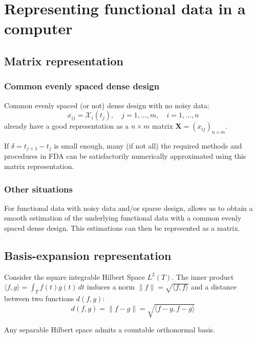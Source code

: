 \pagebreak
\section[Representing functional data]{Representing functional data in a computer}

\subsection{Matrix representation}

\subsubsection{Common evenly spaced dense design}
Common evenly spaced (or not) dense design with no noisy data:
\begin{equation*}
	x_{ij} = \mathcal X_i(t_j),\quad j=1,\ldots,m,\quad i=1,\ldots,n
\end{equation*}
already have a good representation as a $n\times m$ matrix
$\boldsymbol X = \left(x_{ij}\right)_{n\times m}$.

If $\delta = t_{j+1} - t_j$ is small enough, many (if not all) the
required methods and procedures in FDA can be satisfactorily numerically
approximated using this matrix representation.

\subsubsection{Other situations}
For functional data with noisy data and/or sparse design,  allows us to obtain a smooth estimation of the
underlying functional data with a common evenly spaced dense design. This
estimations can then be represented as a matrix.

\subsection{Basis-expansion representation}

Consider the square integrable Hilbert Space $L^2(T)$.
The inner product $\langle f, g\rangle = \int_T f(t)g(t)\,dt$ induces
a norm $\|f\| = \sqrt{\langle f, f\rangle}$ and a distance
between two functions $d(f, g)$:
\begin{equation*}
	d(f, g) = \lVert f - g \rVert = \sqrt{\langle f - g, f - g\rangle}
\end{equation*}

\begin{prop*}{}
	Any separable Hilbert space admits a countable orthonormal basis.
\end{prop*}

